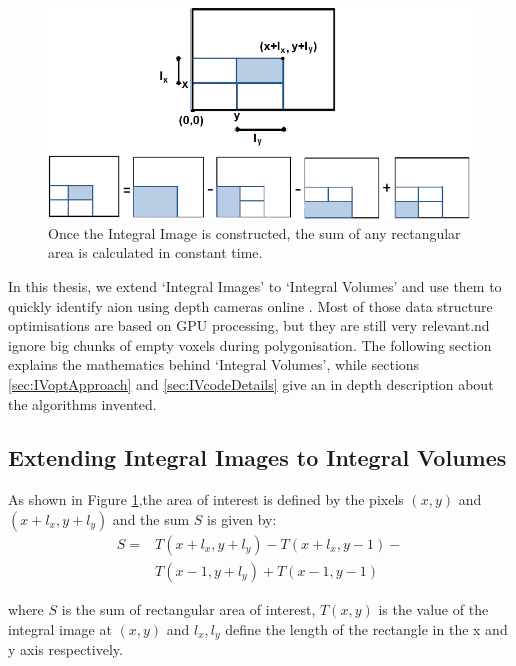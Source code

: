 \documentclass{subfiles}
\begin{document}
\begin{figure}[!htbp]
	\centering
	\includegraphics[width=5.5in]{img/IntegralImages}
	\caption[Integral Image]{Once the Integral Image is constructed, the sum of any rectangular area is calculated in constant time.}
	\label{fig:IntegralImages}
\end{figure}


In this thesis, we extend `Integral Images' to `Integral Volumes' and use them to quickly identify aion using depth cameras online \cite{Nievner2016voxelHashing}. Most of those data structure optimisations are based on GPU processing, but they are still very relevant.nd ignore big chunks of empty voxels during polygonisation. The following section explains the mathematics behind `Integral Volumes', while sections \ref{sec:IVoptApproach}  and \ref{sec:IVcodeDetails} give an in depth description about the algorithms invented. 

\subsection{Extending Integral Images to Integral Volumes}\label{sec:extendingIV}

As shown in Figure \ref{fig:IntegralImages},the area of interest is defined by the pixels $(x, y)$ and $(x+l_x, y+l_y)$ and the sum $S$ is given by: 
\begin{equation}
\begin{split}
S = & T(x+l_x,y+l_y) - 
T(x+l_x,y-1)- \\
&  T(x-1,y+l_y) +
T(x-1,y-1)
\end{split}
\label{eq:IntegralImage}
\end{equation}

where 	$S$ is the sum of rectangular area of interest, $T(x, y)$ is the value of the integral image at $(x, y)$ and $l_x, l_y$ define the length of the rectangle in the x and y axis respectively. 
\end{document}
